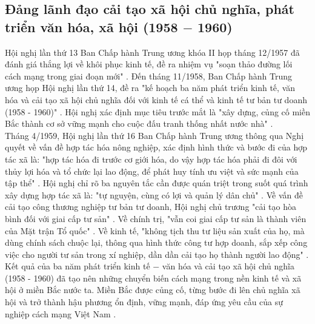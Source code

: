 \subsection{Đảng lãnh đạo cải tạo xã hội chủ nghĩa, phát triển văn hóa, xã hội (1958 $-$ 1960)}
Hội nghị lần thứ 13 Ban Chấp hành Trung ương khóa II họp tháng 12/1957 đã đánh giá thắng lợi về khôi phục kinh tế, đề ra nhiệm vụ "soạn thảo đường lối cách mạng trong giai đoạn mới" \supercite{giaotrinh}. Đến tháng 11/1958, Ban Chấp hành Trung ương họp Hội nghị lần thứ 14, đề ra "kế hoạch ba năm phát triển kinh tế, văn hóa và cải tạo xã hội chủ nghĩa đối với kinh tế cá thể và kinh tế tư bản tư doanh (1958 - 1960)" \supercite{giaotrinh}. Hội nghị xác định mục tiêu trước mắt là "xây dựng, củng cố miền Bắc thành cơ sở vững mạnh cho cuộc đấu tranh thống nhất nước nhà" \supercite{giaotrinh}.\\
Tháng 4/1959, Hội nghị lần thứ 16 Ban Chấp hành Trung ương thông qua Nghị quyết về vấn đề hợp tác hóa nông nghiệp, xác định hình thức và bước đi của hợp tác xã là: "hợp tác hóa đi trước cơ giới hóa, do vậy hợp tác hóa phải đi đôi với thủy lợi hóa và tổ chức lại lao động, để phát huy tính ưu việt và sức mạnh của tập thể" \supercite{giaotrinh}. Hội nghị chỉ rõ ba nguyên tắc cần được quán triệt trong suốt quá trình xây dựng hợp tác xã là: "tự nguyện, cùng có lợi và quản lý dân chủ" \supercite{hn16k2}. Về vấn đề cải tạo công thương nghiệp tư bản tư doanh, Hội nghị chủ trương "cải tạo hòa bình đối với giai cấp tư sản" \supercite{giaotrinh}. Về chính trị, "vẫn coi giai cấp tư sản là thành viên của Mặt trận Tổ quốc" \supercite{giaotrinh}. Về kinh tế, "không tịch thu tư liệu sản xuất của họ, mà dùng chính sách chuộc lại, thông qua hình thức công tư hợp doanh, sắp xếp công việc cho người tư sản trong xí nghiệp, dần dần cải tạo họ thành người lao động" \supercite{giaotrinh}.\\
Kết quả của ba năm phát triển kinh tế $-$ văn hóa và cải tạo xã hội chủ nghĩa (1958 - 1960) đã tạo nên những chuyển biến cách mạng trong nền kinh tế và xã hội ở miền Bắc nước ta. Miền Bắc được củng cố, từng bước đi lên chủ nghĩa xã hội và trở thành hậu phương ổn định, vững mạnh, đáp ứng yêu cầu của sự nghiệp cách mạng Việt Nam \supercite{giaotrinh}.